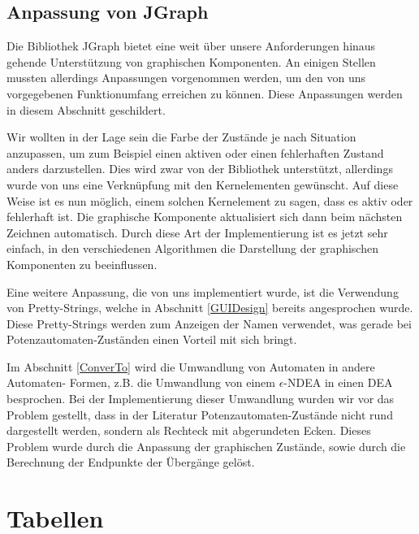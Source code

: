 \subsection{Anpassung von JGraph}\label{GraphJGraphAdaptation}

Die Bibliothek JGraph bietet eine weit über unsere Anforderungen hinaus
gehende Unterstützung von graphischen Komponenten. An einigen Stellen mussten
allerdings Anpassungen vorgenommen werden, um den von uns vorgegebenen
Funktionumfang erreichen zu können. Diese Anpassungen werden in diesem
Abschnitt geschildert.\vspace{10pt}

Wir wollten in der Lage sein die Farbe der Zustände je nach Situation anzupassen,
um zum Beispiel einen aktiven oder einen fehlerhaften Zustand anders
darzustellen. Dies wird zwar von der Bibliothek unterstützt, allerdings wurde von
uns eine Verknüpfung mit den Kernelementen gewünscht. Auf diese Weise ist es nun
möglich, einem solchen Kernelement zu sagen, dass es aktiv oder fehlerhaft ist.
Die graphische Komponente aktualisiert sich dann beim nächsten Zeichnen
automatisch. Durch diese Art der Implementierung ist es jetzt sehr einfach, in
den verschiedenen Algorithmen die Darstellung der graphischen Komponenten zu
beeinflussen.\vspace{10pt}

Eine weitere Anpassung, die von uns implementiert wurde, ist die Verwendung von
Pretty-Strings, welche in Abschnitt \ref{GUIDesign} bereits angesprochen wurde.
Diese Pretty-Strings werden zum Anzeigen der Namen verwendet, was gerade bei
Potenzautomaten-Zuständen einen Vorteil mit sich bringt.\vspace{10pt}

Im Abschnitt \ref{ConverTo} wird die Umwandlung von Automaten in andere
Automaten- Formen, z.B. die Umwandlung von einem $\epsilon$-NDEA in einen DEA besprochen.
Bei der Implementierung dieser Umwandlung wurden wir vor das Problem gestellt,
dass in der Literatur Potenzautomaten-Zustände nicht rund dargestellt werden,
sondern als Rechteck mit abgerundeten Ecken. Dieses Problem wurde durch die
Anpassung der graphischen Zustände, sowie durch die Berechnung der Endpunkte der
Übergänge gelöst.\vspace{10pt}


\section{Tabellen}\label{Tables}

